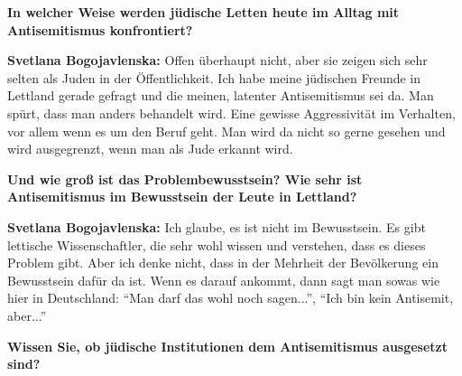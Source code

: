 \textbf{In welcher Weise werden jüdische Letten heute im Alltag mit Antisemitismus konfrontiert?}

\textbf{Svetlana Bogojavlenska:} Offen überhaupt nicht, aber sie zeigen sich sehr selten als Juden in der Öffentlichkeit. Ich habe meine jüdischen Freunde in Lettland gerade gefragt und die meinen, latenter Antisemitismus sei da. Man spürt, dass man anders behandelt wird. Eine gewisse Aggressivität im Verhalten, vor allem wenn es um den Beruf geht. Man wird da nicht so gerne gesehen und wird ausgegrenzt, wenn man als Jude erkannt wird. 

\textbf{Und wie groß ist das Problembewusstsein? Wie sehr ist Antisemitismus im Bewusstsein der Leute in Lettland?}

\textbf{Svetlana Bogojavlenska:} Ich glaube, es ist nicht im Bewusstsein. Es gibt lettische Wissenschaftler, die sehr wohl wissen und verstehen, dass es dieses Problem gibt. Aber ich denke nicht, dass in der Mehrheit der Bevölkerung ein Bewusstsein dafür da ist. Wenn es darauf ankommt, dann sagt man sowas wie hier in Deutschland: "`Man darf das wohl noch sagen..."', "`Ich bin kein Antisemit, aber..."' 

\textbf{Wissen Sie, ob jüdische Institutionen dem Antisemitismus ausgesetzt sind?}

